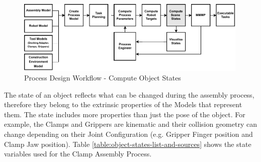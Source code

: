 \begin{figure}[!h]
    \centering
    \includegraphics[width=0.99\textwidth]{images/6a/process_5.pdf}
    \caption{Process Design Workflow - Compute Object States}
    \label{fig:process-design-5}
\end{figure}



The state of an object reflects what can be changed during the assembly process, therefore they belong to the extrinsic properties of the Models that represent them. The state includes more properties than just the pose of the object. For example, the Clamps and Grippers are kinematic and their collision geometry can change depending on their Joint Configuration (e.g. Gripper Finger position and Clamp Jaw position). Table \ref{table:object-states-list-and-sources} shows the state variables used for the Clamp Assembly Process.

